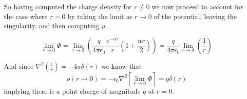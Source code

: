 \documentclass{article}
\begin{document}
So having computed the charge density for $r\ne 0$ we now proceed to account for the case where $r=0$ by taking the limit as $r\to 0$ of the potential, leaving the singularity, and then computing $\rho$.

\[ \lim\limits_{r\to 0} \Phi = \lim\limits_{r\to 0} \left( \frac{q}{4\pi\epsilon_{0}} \frac{e^{-\alpha r}}{r} \left( 1 + \frac{\alpha r}{2} \right)\right) = \frac{q}{4\pi\epsilon_{0}} \lim\limits_{r\to 0} \left( \frac{1}{r} \right)\]

And since $\nabla^{2}\left(\frac{1}{r}\right)=-4\pi\delta(r)$ we know that
\[ \rho(r\to 0) = -\epsilon_{0}\nabla^{2}\left[\lim\limits_{r\to 0}\Phi\right] = \boxed{q\delta(r)} \]
implying there is a point charge of magnitude $q$ at $r=0$.
\end{document}
